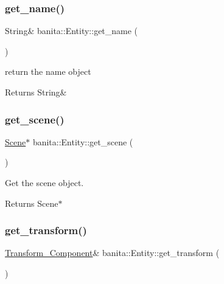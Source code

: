 \subsubsection{\texorpdfstring{get\_name()}{get\_name()}}
{\footnotesize\ttfamily String\& banita\+::\+Entity\+::get\+\_\+name (\begin{DoxyParamCaption}{ }\end{DoxyParamCaption})\hspace{0.3cm}{\ttfamily [inline]}}



return the name object 

\begin{DoxyReturn}{Returns}
String\& 
\end{DoxyReturn}
\mbox{\label{classbanita_1_1_entity_abc8ae6f7a0de629ae3a35d904c4338de}} 
\subsubsection{\texorpdfstring{get\_scene()}{get\_scene()}}
{\footnotesize\ttfamily \mbox{\hyperlink{classbanita_1_1_scene}{Scene}}$\ast$ banita\+::\+Entity\+::get\+\_\+scene (\begin{DoxyParamCaption}{ }\end{DoxyParamCaption})\hspace{0.3cm}{\ttfamily [inline]}}



Get the scene object. 

\begin{DoxyReturn}{Returns}
Scene$\ast$ 
\end{DoxyReturn}
\mbox{\label{classbanita_1_1_entity_af19f6e2e27d0f519032da54ef7dec759}} 
\subsubsection{\texorpdfstring{get\_transform()}{get\_transform()}}
{\footnotesize\ttfamily \mbox{\hyperlink{classbanita_1_1_transform___component}{Transform\+\_\+\+Component}}\& banita\+::\+Entity\+::get\+\_\+transform (\begin{DoxyParamCaption}{ }\end{DoxyParamCaption})\hspace{0.3cm}{\ttfamily [inline]}}



